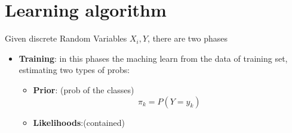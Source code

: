 \section{Learning algorithm}
Given discrete Random Variables $X_i, Y$, there are two phases
\begin{itemize}
    \item \textbf{Training}: in this phases the maching learn from the data of training set, estimating two types of probs:
    \begin{itemize}
        \item \textbf{Prior}: (prob of the classes)
        \[
            \pi_k = P(Y = y_k)
        \]
        \item \textbf{Likelihoods}:(contained)
    \end{itemize}
\end{itemize}

